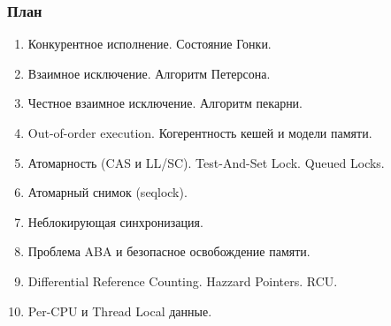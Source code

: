 \begin{frame}
\frametitle{План}

\begin{enumerate}
  \item Конкурентное исполнение. Состояние Гонки.
  \item Взаимное исключение. Алгоритм Петерсона.
  \item Честное взаимное исключение. Алгоритм пекарни.
  \item Out-of-order execution. Когерентность кешей и модели памяти.
  \item Атомарность (CAS и LL/SC). Test-And-Set Lock. Queued Locks.
  \item Атомарный снимок (seqlock).
  \item Неблокирующая синхронизация.
  \item Проблема ABA и безопасное освобождение памяти.
  \item Differential Reference Counting. Hazzard Pointers. RCU.
  \item Per-CPU и Thread Local данные.
\end{enumerate}
\end{frame}

